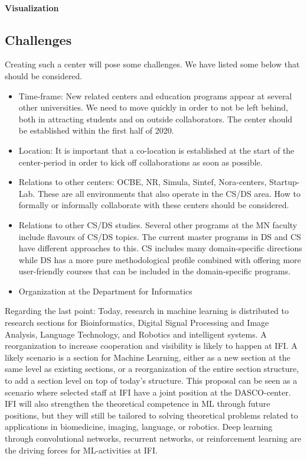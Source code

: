 \documentclass[a4paper,10pt]{article}
\begin{document}
\paragraph{Visualization}


\subsection{Challenges}
Creating such a center will pose some challenges. We have listed some below that should be considered. 
\begin{itemize}
\item Time-frame: New related centers and education programs appear at several other universities. We need to move quickly in order to not be left behind, both in attracting students and on outside collaborators. The center should be established within the first half of 2020.
\item Location: It is important that a co-location is established at the start of the center-period in order to kick off collaborations as soon as possible. 

\item Relations to other centers: OCBE, NR, Simula, Sintef, Nora-centers, Startup-Lab. These are all environments that also operate in the CS/DS area. How to formally or informally collaborate with these centers should be considered.
\item Relations to other CS/DS studies. Several other programs at the MN faculty include flavours of CS/DS topics. The current master programs in DS and CS have different approaches to this. CS includes many domain-specific directions while DS has a more pure methodological profile combined with offering more user-friendly courses that can be included in the domain-specific programs.   
\item Organization at the Department for Informatics 
\end{itemize}
 Regarding the last point: Today, research in machine learning is distributed to research sections for Bioinformatics,   Digital Signal Processing and Image Analysis, Language Technology, and Robotics and intelligent systems. A reorganization to increase cooperation and visibility  is likely to happen at IFI. A likely scenario is a section for Machine Learning, either as a new section at the same level as existing sections, or a reorganization of the entire section structure, to add a section level on top of today's structure. This proposal can be seen as a scenario where selected staff at IFI have a joint position at the DASCO-center. IFI will also strengthen the theoretical competence in ML through future positions, but they will still be tailored to solving theoretical problems related to applications in biomedicine, imaging, language, or robotics. Deep learning through convolutional networks,  recurrent networks, or reinforcement learning are the driving forces for ML-activities at IFI.  
\end{document}
